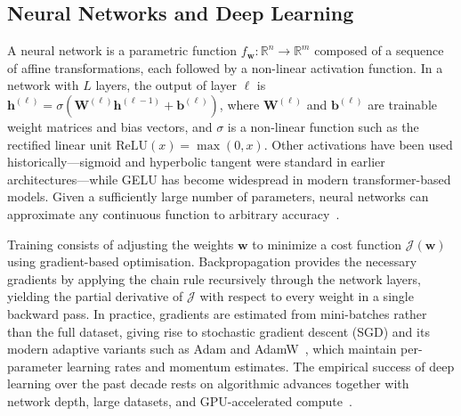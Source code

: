 \subsection{Neural Networks and Deep Learning}
\label{sec:3.3.2}

A neural network is a parametric function $f_{\boldsymbol{w}}: \mathbb{R}^n \to \mathbb{R}^m$ composed of a sequence of affine transformations, each followed by a non-linear activation function.
In a network with $L$ layers, the output of layer $\ell$ is $\mathbf{h}^{(\ell)} = \sigma(\mathbf{W}^{(\ell)}\mathbf{h}^{(\ell-1)} + \mathbf{b}^{(\ell)})$, where $\mathbf{W}^{(\ell)}$ and $\mathbf{b}^{(\ell)}$ are trainable weight matrices and bias vectors, and $\sigma$ is a non-linear function such as the rectified linear unit $\mathrm{ReLU}(x) = \max(0, x)$.
Other activations have been used historically---sigmoid and hyperbolic tangent were standard in earlier architectures---while GELU has become widespread in modern transformer-based models.
Given a sufficiently large number of parameters, neural networks can approximate any continuous function to arbitrary accuracy~\cite{bishop,Goodfellow:2016dlbook}.

Training consists of adjusting the weights $\boldsymbol{w}$ to minimize a cost function $\mathcal{J}(\boldsymbol{w})$ using gradient-based optimisation.
Backpropagation provides the necessary gradients by applying the chain rule recursively through the network layers, yielding the partial derivative of $\mathcal{J}$ with respect to every weight in a single backward pass.
In practice, gradients are estimated from mini-batches rather than the full dataset, giving rise to stochastic gradient descent (SGD) and its modern adaptive variants such as Adam and AdamW~\cite{Loshchilov:2017bsp}, which maintain per-parameter learning rates and momentum estimates.
The empirical success of deep learning over the past decade rests on algorithmic advances together with network depth, large datasets, and GPU-accelerated compute~\cite{LeCun:2015pmr}.

